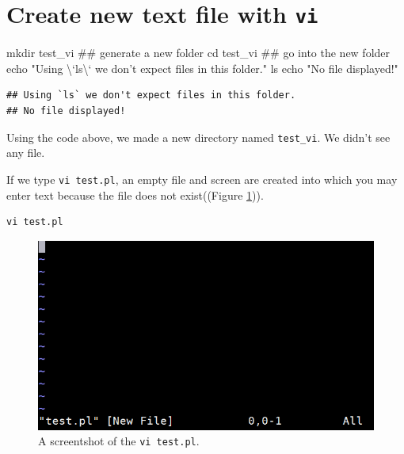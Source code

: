 \documentclass[]{book}
\makeatletter
\newenvironment{Shaded}{\begin{snugshade}}{\end{snugshade}}
\newcommand{\BuiltInTok}[1]{#1}
\newcommand{\DataTypeTok}[1]{\textcolor[rgb]{0.13,0.29,0.53}{#1}}
\newcommand{\FunctionTok}[1]{\textcolor[rgb]{0.00,0.00,0.00}{#1}}
\newcommand{\NormalTok}[1]{#1}
\newcommand{\StringTok}[1]{\textcolor[rgb]{0.31,0.60,0.02}{#1}}
\newenvironment{kframe}{%
\medskip{}
\setlength{\fboxsep}{.8em}
 \def\at@end@of@kframe{}%
 \ifinner\ifhmode%
  \def\at@end@of@kframe{\end{minipage}}%
  \begin{minipage}{\columnwidth}%
 \fi\fi%
 \def\FrameCommand##1{\hskip\@totalleftmargin \hskip-\fboxsep
 \colorbox{shadecolor}{##1}\hskip-\fboxsep
     \hskip-\linewidth \hskip-\@totalleftmargin \hskip\columnwidth}%
 \MakeFramed {\advance\hsize-\width
   \@totalleftmargin\z@ \linewidth\hsize
   \@setminipage}}%
 {\par\unskip\endMakeFramed%
 \at@end@of@kframe}
\renewenvironment{Shaded}{\begin{kframe}}{\end{kframe}}
\makeatother
\begin{document}
\hypertarget{create-new-text-file-with-vi}{%
\section{\texorpdfstring{Create new text file with \texttt{vi}}{Create new text file with vi}}\label{create-new-text-file-with-vi}}

\begin{Shaded}
\begin{Highlighting}[]
\FunctionTok{mkdir}\NormalTok{ test_vi  ## generate a new folder}
\BuiltInTok{cd}\NormalTok{ test_vi     ## go into the new folder}
\BuiltInTok{echo} \StringTok{"Using }\DataTypeTok{\textbackslash{}`}\StringTok{ls}\DataTypeTok{\textbackslash{}`}\StringTok{ we don't expect files in this folder."}
\FunctionTok{ls} 
\BuiltInTok{echo} \StringTok{"No file displayed!"}
\end{Highlighting}
\end{Shaded}

\begin{verbatim}
## Using `ls` we don't expect files in this folder.
## No file displayed!
\end{verbatim}

Using the code above, we made a new directory named \texttt{test\_vi}. We didn't see any file.

If we type \texttt{vi\ test.pl}, an empty file and screen are created into which you may enter text because the file does not exist((Figure \ref{fig:ViNewFile})).

\begin{verbatim}
vi test.pl
\end{verbatim}



\begin{figure}

{\centering \includegraphics[width=1\linewidth]{images/vi_new_file} 

}

\caption{A screentshot of the \texttt{vi\ test.pl}.}\label{fig:ViNewFile}
\end{figure}
\end{document}
